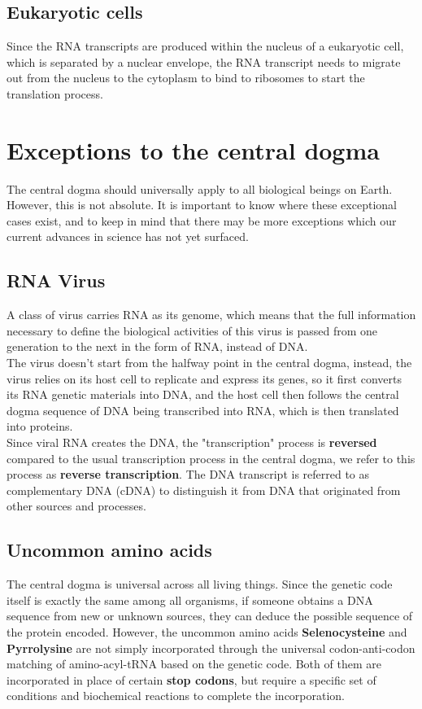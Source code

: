 \documentclass[11pt]{article}
\begin{document}
\subsection{Eukaryotic cells}
\label{sec:org7008a7f}
Since the RNA transcripts are produced within the nucleus of a eukaryotic cell, which is separated by a nuclear envelope, the RNA transcript needs to migrate out from the nucleus to the cytoplasm to bind to ribosomes to start the translation process.

\newpage

\section{Exceptions to the central dogma}
\label{sec:orgba71f54}

The central dogma should universally apply to all biological beings on Earth. However, this is not absolute. It is important to know where these exceptional cases exist, and to keep in mind that there may be more exceptions which our current advances in science has not yet surfaced.

\subsection{RNA Virus}
\label{sec:org4e71fc4}
A class of virus carries RNA as its genome, which means that the full information necessary to define the biological activities of this virus is passed from one generation to the next in the form of RNA, instead of DNA.
\\[0pt]

The virus doesn't start from the halfway point in the central dogma, instead, the virus relies on its host cell to replicate and express its genes, so it first converts its RNA genetic materials into DNA, and the host cell then follows the central dogma sequence of DNA being transcribed into RNA, which is then translated into proteins.
\\[0pt]

Since viral RNA creates the DNA, the "transcription" process is \textbf{reversed} compared to the usual transcription process in the central dogma, we refer to this process as \textbf{reverse transcription}. The DNA transcript is referred to as complementary DNA (cDNA) to distinguish it from DNA that originated from other sources and processes.

\subsection{Uncommon amino acids}
\label{sec:org12b82fe}
The central dogma is universal across all living things. Since the genetic code itself is exactly the same among all organisms, if someone obtains a DNA sequence from new or unknown sources, they can deduce the possible sequence of the protein encoded. However, the uncommon amino acids \textbf{Selenocysteine} and \textbf{Pyrrolysine} are not simply incorporated through the universal codon-anti-codon matching of amino-acyl-tRNA based on the genetic code. Both of them are incorporated in place of certain \textbf{stop codons}, but require a specific set of conditions and biochemical reactions to complete the incorporation.
\end{document}
